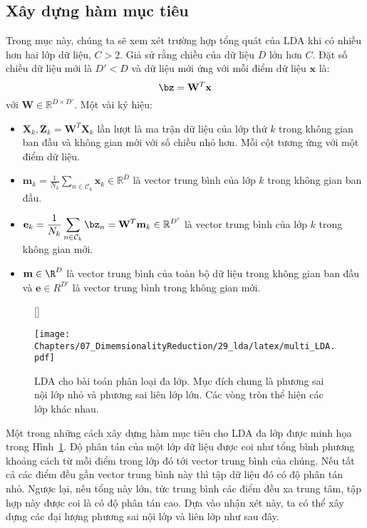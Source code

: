 \subsection{Xây dựng hàm mục tiêu}
Trong mục này, chúng ta sẽ xem xét trường hợp tổng quát của LDA khi có nhiều hơn hai lớp
dữ
liệu, $C > 2$. Giả sử rằng chiều của dữ liệu $D$ lớn hơn $C$.
Đặt số chiều dữ liệu mới là $D' < D$ và dữ liệu mới ứng với mỗi điểm dữ liệu $\mathbf{x}$ là:
\begin{equation}
\bz = \mathbf{W}^T\mathbf{x}
\end{equation}
với $\mathbf{W} \in \mathbb{R}^{D\times D'}$.
\newpage
Một vài ký hiệu:
\begin{itemize}
\item $\mathbf{X}_k, \mathbf{Z}_k = \mathbf{W}^T\mathbf{X}_k$ lần lượt là ma
trận dữ liệu của lớp thứ $k$ trong không gian ban đầu và không gian mới với số
chiều nhỏ hơn. Mỗi cột tương ứng với một điểm dữ liệu.

\item $\displaystyle \mathbf{m}_k = \frac{1}{N_k}\sum_{n \in
\mathcal{C}_k}\mathbf{x}_k \in \mathbb{R}^{D}$ là vector trung bình của lớp $k$ trong không gian ban đầu.

\item $\displaystyle \mathbf{e}_k = \frac{1}{N_k}\sum_{n \in \mathcal{C}_k}
\bz_n = \mathbf{W}^T\mathbf{m}_k \in \mathbb{R}^{D'}$ là vector trung bình của lớp
$k$ trong không gian mới.

\item $\mathbf{m} \in \R^D$ là vector trung bình của toàn bộ dữ liệu trong không
gian ban đầu và $\mathbf{e} \in R^{D'}$ là vector trung bình trong không gian
mới.
\end{itemize}


\begin{figure}[t]
[\FBwidth]
{\caption{ LDA cho bài toán phân loại đa lớp. Mục đích chung là phương sai nội lớp nhỏ và phương sai liên lớp lớn. Các vòng tròn thể hiện các lớp khác nhau. }
\label{fig:29_3}}
{ %
\texttt{[image: Chapters/07\_DimemsionalityReduction/29\_lda/latex/multi\_LDA.pdf]}
}
\end{figure}
Một trong những cách xây dựng hàm mục tiêu cho LDA đa lớp được minh họa
trong Hình~\ref{fig:29_3}. Độ phân tán của một lớp dữ liệu được coi
như tổng bình phương khoảng cách từ mỗi điểm trong lớp đó tới vector trung bình của chúng. Nếu
tất cả các điểm đều gần vector trung bình này thì tập dữ liệu đó có độ phân tán nhỏ. Ngược lại, nếu tổng này lớn, tức trung bình các điểm đều
xa trung tâm, tập hợp này được coi là có độ phân tán cao.
Dựa vào nhận xét này, ta có thể xây dựng các đại lượng phương sai nội lớp và liên lớp như sau đây.

